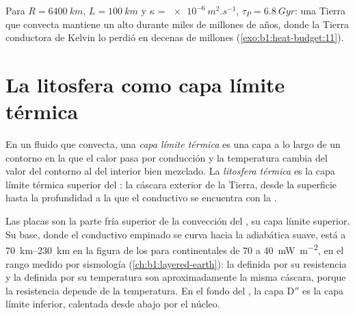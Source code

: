 Para $R = \qty{6400}{km}$, $L = \qty{100}{km}$ y $\kappa =
\qty{e-6}{m^2.s^{-1}}$, $\tau_P = \qty{6.8}{Gyr}$: una Tierra que
convecta mantiene un  alto durante miles de millones de años, donde la Tierra conductora de Kelvin lo perdió en
decenas de millones (\cref{exo:b1:heat-budget:11}).

\section{La litosfera como capa límite térmica}\label{sec:b1:heat-budget:boundary-layer}

\begin{definition}\label{def:b1:heat-budget:boundary-layer}
En un fluido que convecta, una \emph{capa límite térmica} es una capa a lo largo de un contorno en la que
el calor pasa por conducción y la temperatura cambia del valor del contorno al del interior bien mezclado. La \emph{litosfera
térmica} es la capa límite térmica superior del : la cáscara exterior de la Tierra, desde la superficie
hasta la profundidad a la que el  conductivo se encuentra con la .
\end{definition}

Las placas son la parte fría superior de la convección del , su capa límite superior. Su base, donde el  conductivo
empinado se curva hacia la adiabática suave, está a \qtyrange{70}{230}{km} en la figura de los  para 
continentales de 70 a \qty{40}{mW.m^{-2}}, en el rango medido por sismología (\cref{ch:b1:layered-earth}): la  definida por
su resistencia y la definida por su temperatura son aproximadamente la misma cáscara, porque la resistencia depende de la
temperatura. En el fondo del , la capa D$''$ es la capa límite inferior, calentada desde abajo por el núcleo.

